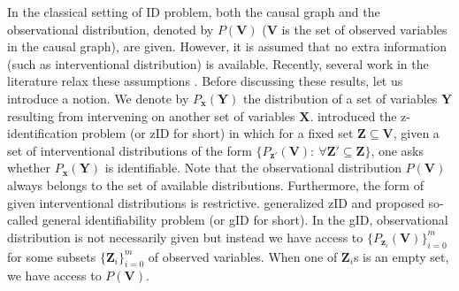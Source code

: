 \documentclass[accepted]{uai2022}
\newcommand{\V}[0]{\mathbf{V}}
\newcommand{\X}[0]{\mathbf{X}}
\newcommand{\Y}[0]{\mathbf{Y}}
\newcommand{\Z}[0]{\mathbf{Z}}
\newcommand{\x}[0]{\mathbf{x}}
\newcommand{\z}[0]{\mathbf{z}}
\begin{document}
    In the classical setting of ID problem, both the causal graph and the observational distribution, denoted by $P(\V)$ ($\V$ is the set of observed variables in the causal graph), are given.
    However, it is assumed that no extra information (such as interventional distribution) is available.
    Recently, several work in the literature relax these assumptions \citep{tikka2019causal,shpitser2012identification,bareinboim2015recovering,bareinboim2014transportability,mokhtarian2022causal}.
    Before discussing these results, let us introduce a notion. 
    We denote by $P_{\x}(\Y)$ the distribution of a set of variables $\Y$ resulting from intervening on another set of variables $\X$.
    \cite{bareinboim2012causal} introduced the z-identification problem (or zID for short) in which for a fixed set $\Z \subseteq \V$, given a set of interventional distributions of the form $\{P_{\z'}(\V):\ \forall \Z' \subseteq \Z\}$, one asks whether $P_{\x}(\Y)$ is identifiable. 
    Note that the observational distribution $P(\V)$ always belongs to the set of available distributions.
    Furthermore, the form of given interventional distributions is restrictive.
    \cite{lee2019general} generalized zID and proposed so-called general identifiability problem (or gID for short). 
    In the gID, observational distribution is not necessarily given but instead we have access to $\{P_{\z_i}(\V)\}_{i=0}^{m}$ for some subsets $\{\Z_i\}_{i=0}^{m}$ of observed variables.  
    When one of $\Z_i$s is an empty set, we have access to $P(\V)$.
    
\end{document}
